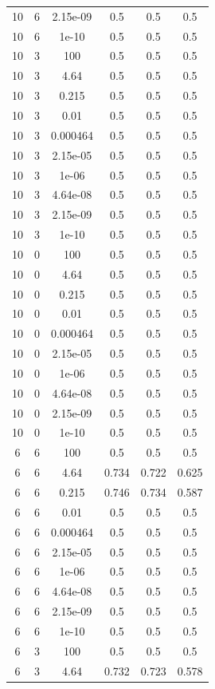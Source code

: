 \begin{table}[ht]
\begin{tabular}{ |c|c|c|c|c|c| }
10 & 6 & 2.15e-09 & 0.5 & 0.5 & 0.5 \\
10 & 6 & 1e-10 & 0.5 & 0.5 & 0.5 \\
10 & 3 & 100 & 0.5 & 0.5 & 0.5 \\
10 & 3 & 4.64 & 0.5 & 0.5 & 0.5 \\
10 & 3 & 0.215 & 0.5 & 0.5 & 0.5 \\
10 & 3 & 0.01 & 0.5 & 0.5 & 0.5 \\
10 & 3 & 0.000464 & 0.5 & 0.5 & 0.5 \\
10 & 3 & 2.15e-05 & 0.5 & 0.5 & 0.5 \\
10 & 3 & 1e-06 & 0.5 & 0.5 & 0.5 \\
10 & 3 & 4.64e-08 & 0.5 & 0.5 & 0.5 \\
10 & 3 & 2.15e-09 & 0.5 & 0.5 & 0.5 \\
10 & 3 & 1e-10 & 0.5 & 0.5 & 0.5 \\
10 & 0 & 100 & 0.5 & 0.5 & 0.5 \\
10 & 0 & 4.64 & 0.5 & 0.5 & 0.5 \\
10 & 0 & 0.215 & 0.5 & 0.5 & 0.5 \\
10 & 0 & 0.01 & 0.5 & 0.5 & 0.5 \\
10 & 0 & 0.000464 & 0.5 & 0.5 & 0.5 \\
10 & 0 & 2.15e-05 & 0.5 & 0.5 & 0.5 \\
10 & 0 & 1e-06 & 0.5 & 0.5 & 0.5 \\
10 & 0 & 4.64e-08 & 0.5 & 0.5 & 0.5 \\
10 & 0 & 2.15e-09 & 0.5 & 0.5 & 0.5 \\
10 & 0 & 1e-10 & 0.5 & 0.5 & 0.5 \\
6 & 6 & 100 & 0.5 & 0.5 & 0.5 \\
6 & 6 & 4.64 & 0.734 & 0.722 & 0.625 \\
6 & 6 & 0.215 & 0.746 & 0.734 & 0.587 \\
6 & 6 & 0.01 & 0.5 & 0.5 & 0.5 \\
6 & 6 & 0.000464 & 0.5 & 0.5 & 0.5 \\
6 & 6 & 2.15e-05 & 0.5 & 0.5 & 0.5 \\
6 & 6 & 1e-06 & 0.5 & 0.5 & 0.5 \\
6 & 6 & 4.64e-08 & 0.5 & 0.5 & 0.5 \\
6 & 6 & 2.15e-09 & 0.5 & 0.5 & 0.5 \\
6 & 6 & 1e-10 & 0.5 & 0.5 & 0.5 \\
6 & 3 & 100 & 0.5 & 0.5 & 0.5 \\
6 & 3 & 4.64 & 0.732 & 0.723 & 0.578 \\

\end{tabular}
\end{table}
